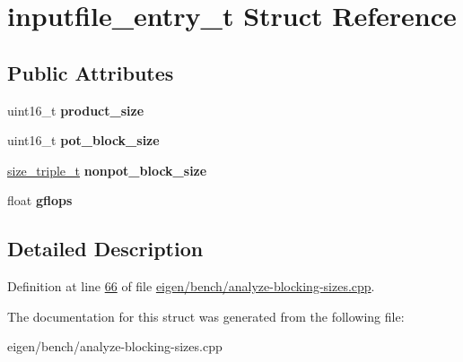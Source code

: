 \hypertarget{structinputfile__entry__t}{}\section{inputfile\+\_\+entry\+\_\+t Struct Reference}
\label{structinputfile__entry__t}
\subsection*{Public Attributes}
\begin{DoxyCompactItemize}
\item 
\mbox{\label{structinputfile__entry__t_a18029d29663849dc5012b1b1fe4d4ae0}} 
uint16\+\_\+t {\bfseries product\+\_\+size}
\item 
\mbox{\label{structinputfile__entry__t_a9f0613b4b908536206ffd45ee9df2a08}} 
uint16\+\_\+t {\bfseries pot\+\_\+block\+\_\+size}
\item 
\mbox{\label{structinputfile__entry__t_a96531a7034d12c03d8a212dd42b0d37c}} 
\hyperlink{structsize__triple__t}{size\+\_\+triple\+\_\+t} {\bfseries nonpot\+\_\+block\+\_\+size}
\item 
\mbox{\label{structinputfile__entry__t_af934c74356ddc39382244d7ee0ad6667}} 
float {\bfseries gflops}
\end{DoxyCompactItemize}


\subsection{Detailed Description}


Definition at line \hyperlink{eigen_2bench_2analyze-blocking-sizes_8cpp_source_l00066}{66} of file \hyperlink{eigen_2bench_2analyze-blocking-sizes_8cpp_source}{eigen/bench/analyze-\/blocking-\/sizes.\+cpp}.



The documentation for this struct was generated from the following file\+:\begin{DoxyCompactItemize}
\item 
eigen/bench/analyze-\/blocking-\/sizes.\+cpp\end{DoxyCompactItemize}
